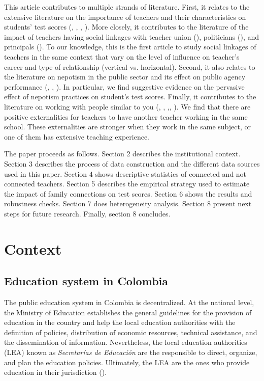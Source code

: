 \documentclass[12pt,runningheads]{article}
\begin{document}
This article contributes to multiple strands of literature. First, it relates to the extensive literature on the importance of teachers and their characteristics on students' test scores (, , , ). More closely, it contributes to the literature of the impact of teachers having social linkages with teacher union (), politicians (), and principals (). To our knowledge, this is the first article to study social linkages of teachers in the same context that vary on the level of influence on teacher's career and type of relationship (vertical vs. horizontal). Second, it also relates to the literature on nepotism in the public sector and its effect on public agency performance (, , ). In particular, we find suggestive evidence on the pervasive effect of nepotism practices on student's test scores. Finally, it contributes to the literature on working with people similar to you (, ,  \cite{Parker2008},\cite{Mcdonald2017}, ). We find that there are positive externalities for teachers to have another teacher working in the same school. These externalities are stronger when they work in the same subject, or one of them has extensive teaching experience.

The paper proceeds as follows. Section 2 describes the institutional context. Section 3 describes the process of data construction and the different data sources used in this paper. Section 4 shows descriptive statistics of connected and not connected teachers. Section 5 describes the empirical strategy used to estimate the impact of family connections on test scores. Section 6 shows the results and robustness checks. Section 7 does heterogeneity analysis. Section 8 present next steps for future research. Finally, section 8 concludes.

\section{Context} 

\subsection{Education system in Colombia} 
The public education system in Colombia is decentralized. At the national level, the Ministry of Education establishes the general guidelines for the provision of education in the country and help the local education authorities with the definition of policies, distribution of economic resources, technical assistance, and the dissemination of information. Nevertheless, the local education authorities (LEA) known as \textit{Secretarías de Educación} are the responsible to direct, organize, and plan the education policies. Ultimately, the LEA are the ones who provide education in their jurisdiction ().
\end{document}
